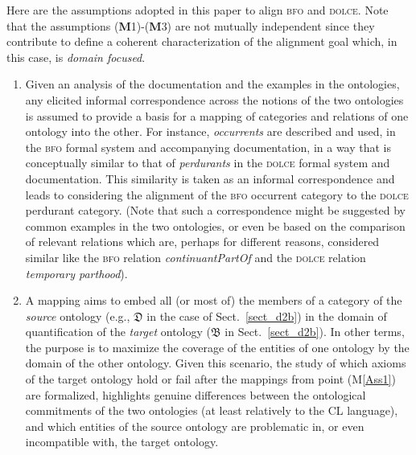 \documentclass[ao]{iosart2x}
\newcommand{\nb}[1]{\textcolor{red}{$|$}\marginpar{\hspace*{-0cm}\parbox{20mm}{\scriptsize\raggedright\textcolor{red}{#1}}}}
\newcommand{\dolce}{{\textsc{dolce}}}
\newcommand{\bfo}{{\textsc{bfo}}}
\newcommand {\thdolce} {\ensuremath{\mathfrak{D}}}
\newcommand {\thbfo} {\ensuremath{\mathfrak{B}}}
\begin{document}
Here are the assumptions %
adopted in this paper to align {\bfo} and {\dolce}. Note that the assumptions ({\bf M}1)-({\bf M}3) are not mutually independent since they contribute to define a coherent characterization of the alignment goal which, in this case, is {\em domain focused}. 
%
\begin{enumerate}[({\bf M}1)]
\item \label{Ass1} %
Given an analysis of the documentation and the examples in the ontologies, any elicited informal correspondence across the notions of the two ontologies 
is assumed to provide a basis for a mapping of categories and relations of one ontology into the other. 
For instance, \emph{occurrents} 
are described and used, in the {\bfo} formal system and accompanying documentation, in a way that is conceptually similar to that of \emph{perdurants} in the {\dolce} formal system and documentation.
This similarity is taken as an informal correspondence and leads to considering the alignment of the {\bfo} occurrent category to the {\dolce} perdurant category. (Note that such a correspondence might be suggested by common examples in the two ontologies, or even be based on the comparison of relevant relations which are, perhaps for different reasons, considered similar like the {\bfo} relation \emph{continuantPartOf} and the {\dolce} relation \emph{temporary parthood}). 

\item \label{Ass2} A mapping aims to %
embed all (or most of) the members of a category of the \emph{source} ontology (e.g., {$\thdolce$} in the case of Sect.~\ref{sect_d2b}) in the domain of quantification of the \emph{target} ontology ({$\thbfo$} in Sect.~\ref{sect_d2b}). In other terms, the purpose is to maximize the coverage of the entities of one ontology by the domain of the other ontology. 
Given this scenario, the study of which axioms of the target ontology hold or fail after the mappings from point (M\ref{Ass1}) are formalized, highlights genuine differences between the ontological commitments of the two ontologies (at least relatively to the CL language), and which entities of the source ontology are problematic in, or even incompatible with, the target ontology.   


\end{enumerate}
\end{document}
